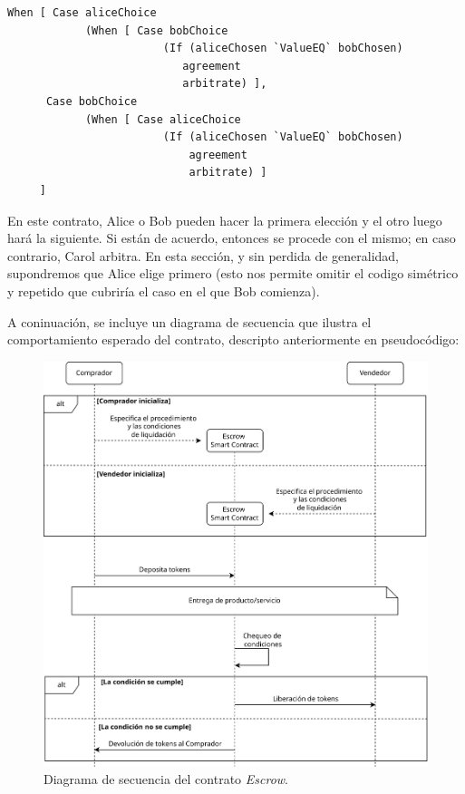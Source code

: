 \documentclass[12pt]{book}
\begin{document}
\begin{lstlisting}[style=Haskell-cardano, language=Marlowe, caption=Pseudocódigo agnóstico al orden de las elecciones.]
When [ Case aliceChoice
            (When [ Case bobChoice
                        (If (aliceChosen `ValueEQ` bobChosen)
                           agreement
                           arbitrate) ],
      Case bobChoice
            (When [ Case aliceChoice
                        (If (aliceChosen `ValueEQ` bobChosen)
                            agreement
                            arbitrate) ]
     ]
\end{lstlisting}

En este contrato, Alice o Bob pueden hacer la primera elección y el otro luego hará la siguiente. Si están de acuerdo, entonces se procede con el mismo; en caso contrario, Carol arbitra. En esta sección, y sin perdida de generalidad, supondremos que Alice elige primero (esto nos permite omitir el codigo simétrico y repetido que cubriría el caso en el que Bob comienza).

A coninuación, se incluye un diagrama de secuencia que ilustra el comportamiento esperado del contrato, descripto anteriormente en pseudocódigo:

\begin{figure}[H]
    \centering
    \includegraphics[width=\textwidth]{Escrow.png}
    \caption{Diagrama de secuencia del contrato \textit{Escrow}.}\label{fig:Escrow}
\end{figure}
\end{document}
